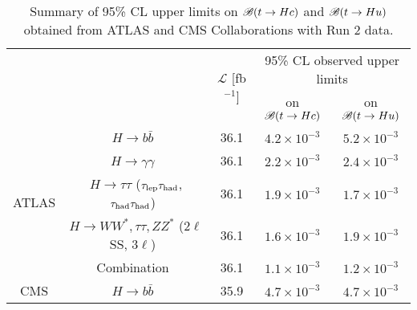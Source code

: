 \begin{table}[t!]
\caption{\small{Summary of 95\% CL upper limits on $\mathscr{B}(t \to Hc)$ and $\mathscr{B}(t \to Hu)$ obtained from ATLAS and CMS Collaborations with Run 2 data.}}
\begin{center}
\small 
\begin{tabular}{ccccc}
\toprule\toprule
& &\multirow{2}{*}{$\mathcal{L}$ [fb$^{-1}$]} & \multicolumn{2}{c}{95\% CL observed upper limits}  \\
& & 										    & \multicolumn{1}{c}{on $\mathscr{B}(t \to Hc)$}            & \multicolumn{1}{c}{on $\mathscr{B}(t \to Hu)$} \\
\midrule
\multirow{5}{*}{ATLAS}
& $H \to b\bar{b}$~\cite{fcnc36}                                          & 36.1         & $4.2 \times 10^{-3}$ & $5.2 \times 10^{-3}$ \\
& $H \to \gamma\gamma$~\cite{Aaboud:2017mfd}                              & 36.1         & $2.2 \times 10^{-3}$  & $2.4 \times 10^{-3}$  \\
& $H \to \tau\tau$ ($\tau_{\mathrm{lep}} \tau_{\mathrm{had}}$, $\tau_{\mathrm{had}} \tau_{\mathrm{had}}$)~\cite{fcnc36}                   & 36.1         & $1.9 \times 10^{-3}$  & $1.7 \times 10^{-3}$  \\ 
& $H \to WW^*, \tau\tau, ZZ^*$ ($2\ell$SS, $3\ell$)~\cite{Aaboud:2018pob} & 36.1         & $1.6 \times 10^{-3}$  & $1.9 \times 10^{-3}$\\ 
& Combination~\cite{fcnc36}                                               & 36.1         & $1.1 \times 10^{-3}$  & $1.2 \times 10^{-3}$  \\\midrule
\multirow{1}{*}{CMS} 
& $H \to b\bar{b}$~\cite{Sirunyan:2017uae}                                & 35.9         & $4.7 \times 10^{-3}$  & $4.7 \times 10^{-3}$  \\
% 
\bottomrule\bottomrule
\end{tabular}
\label{tab:limits_summary_ref}
\end{center}
\end{table}




